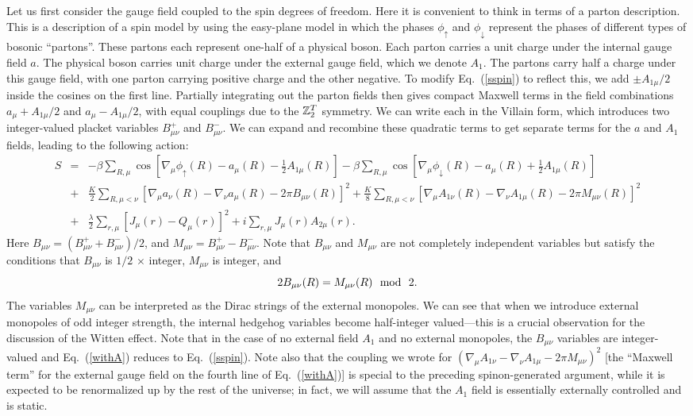 Let us first consider the gauge field coupled to the spin degrees of freedom. Here it is convenient to think in terms of a parton description. This is a description of a spin model by using the easy-plane \cp model in which the phases $\phi_\uparrow$ and $\phi_\downarrow$ represent the phases of different types of bosonic ``partons''. These partons each represent one-half of a physical boson. Each parton carries a unit charge under the internal gauge field $a$. The physical boson carries unit charge under the external gauge field, which we denote $A_1$. The partons carry half a charge under this gauge field, with one parton carrying positive charge and the other negative.
To modify Eq.~(\ref{sspin}) to reflect this, we add $\pm A_{1\mu}/2$ inside the cosines on the first line. 
Partially integrating out the parton fields then gives compact Maxwell terms in the field combinations $a_\mu+A_{1\mu}/2$ and $a_\mu-A_{1\mu}/2$, with equal couplings due to the $\mathbb{Z}_2^T$ symmetry. We can write each in the Villain form, which introduces two integer-valued placket variables $B^+_{\mu\nu}$ and $B^-_{\mu\nu}$. We can expand and recombine these quadratic terms to get separate terms for the $a$ and $A_1$ fields, leading to the following action:
\begin{eqnarray}
S&=&-\beta\sum_{R,\mu} \cos[\nabla_\mu\phi_\uparrow(R)-a_\mu(R)-\frac{1}{2}A_{1\mu}(R)]
-\beta\sum_{R,\mu} \cos[\nabla_\mu\phi_\downarrow(R)-a_\mu(R)+\frac{1}{2}A_{1\mu}(R)]\nonumber\\
&+&\frac{K}{2}\sum_{R,\mu<\nu}\left[\nabla_\mu a_\nu(R)-\nabla_\nu a_\mu(R)-2\pi B_{\mu\nu}(R)\right]^2
+\frac{K}{8}\sum_{R,\mu<\nu}\left[\nabla_\mu A_{1\nu}(R)-\nabla_\nu A_{1\mu}(R)-2\pi M_{\mu\nu}(R)\right]^2\nonumber\\
&+&\frac{\lambda}{2}\sum_{r,\mu} [ J_\mu(r)- Q_\mu(r)]^2+i\sum_{r,\mu}J_{\mu}(r)A_{2\mu}(r).
\label{withA}
\end{eqnarray}
Here $B_{\mu\nu}=(B^+_{\mu\nu}+B^-_{\mu\nu})/2$, and $M_{\mu\nu}=B^+_{\mu\nu}-B^-_{\mu\nu}$. Note that $B_{\mu\nu}$ and $M_{\mu\nu}$ are not completely independent variables but satisfy the conditions that $B_{\mu\nu}$ is $1/2$ $\times$ integer, $M_{\mu\nu}$ is integer, and 
\begin{equation}
2B_{\mu\nu}(R)=M_{\mu\nu}(R) ~~{\rm mod}~~2. 
\label{constraint}
\end{equation}
The variables $M_{\mu\nu}$ can be interpreted as the Dirac strings of the external monopoles. We can see that when we introduce external monopoles of odd integer strength, the internal hedgehog variables become half-integer valued---this is a crucial observation for the discussion of the Witten effect.\cite{Max}  Note that in the case of no external field $A_1$ and no external monopoles, the $B_{\mu\nu}$ variables are integer-valued and Eq.~(\ref{withA}) reduces to Eq.~(\ref{sspin}).  Note also that the coupling we wrote for $(\nabla_\mu A_{1\nu}-\nabla_\nu A_{1\mu}-2\pi M_{\mu\nu})^2$ [the ``Maxwell term'' for the external gauge field on the fourth line of Eq.~(\ref{withA})] is special to the preceding spinon-generated argument, while it is expected to be renormalized up by the rest of the universe; in fact, we will assume that the $A_1$ field is essentially externally controlled and is static.

